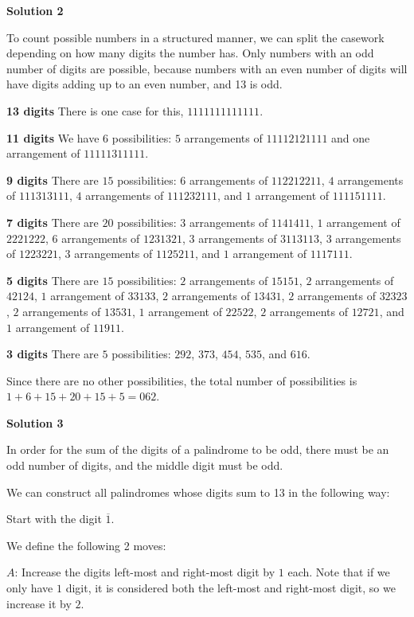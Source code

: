 \begin{enumerate}
\textbf{Solution 2}

To count possible numbers in a structured manner, we can split the casework depending on how many digits the number has. Only numbers with an odd number of digits are possible, because numbers with an even number of digits will have digits adding up to an even number, and 13 is odd.

 \textbf{13 digits} There is one case for this, $1111111111111$.

 \textbf{11 digits} We have $6$ possibilities: $5$ arrangements of $11112121111$ and one arrangement of $11111311111$.

 \textbf{9 digits} There are $15$ possibilities: $6$ arrangements of $112212211$, $4$ arrangements of $111313111$, $4$ arrangements of $111232111$, and $1$ arrangement of $111151111$.

 \textbf{7 digits} There are $20$ possibilities: $3$ arrangements of $1141411$, $1$ arrangement of $2221222$, $6$ arrangements of $1231321$, $3$ arrangements of $3113113$, $3$ arrangements of $1223221$, $3$ arrangements of $1125211$, and $1$ arrangement of $1117111$.

 \textbf{5 digits} There are $15$ possibilities: $2$ arrangements of $15151$, $2$ arrangements of $42124$, $1$ arrangement of $33133$, $2$ arrangements of $13431$, $2$ arrangements of $32323$, $2$ arrangements of $13531$, $1$ arrangement of $22522$, $2$ arrangements of $12721$, and $1$ arrangement of $11911$.

 \textbf{3 digits} There are $5$ possibilities: $292$, $373$, $454$, $535$, and $616$.

 Since there are no other possibilities, the total number of possibilities is $1 + 6 + 15 + 20 + 15 + 5 = \boxed{062}$.

 



\textbf{Solution 3}

In order for the sum of the digits of a palindrome to be odd, there must be an odd number of digits, and the middle digit must be odd.

 We can construct all palindromes whose digits sum to 13 in the following way: 

 Start with the digit $\overline{1}$.

 We define the following 2 moves:

 $A$: Increase the digits left-most and right-most digit by $1$ each. Note that if we only have $1$ digit, it is considered both the left-most and right-most digit, so we increase it by $2$.


\end{enumerate}

